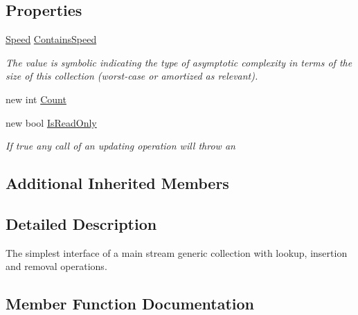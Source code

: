 \subsection*{Properties}
\begin{DoxyCompactItemize}
\item 
\hyperlink{namespace_c5_a615ba88dcdaa8d5a3c5f833a73d7fad6}{Speed} \hyperlink{interface_c5_1_1_i_collection_a0a9bcd98894c191206e18c7c20c3bdfe}{Contains\+Speed}
\begin{DoxyCompactList}\small\item\em The value is symbolic indicating the type of asymptotic complexity in terms of the size of this collection (worst-\/case or amortized as relevant). \end{DoxyCompactList}\item 
new int \hyperlink{interface_c5_1_1_i_collection_abddff5406ccd4e98d8d96f41bf9d6d5b}{Count}
\item 
new bool \hyperlink{interface_c5_1_1_i_collection_a94b0751f2b2fbd0519233b2755c055b4}{Is\+Read\+Only}
\begin{DoxyCompactList}\small\item\em If true any call of an updating operation will throw an \end{DoxyCompactList}\end{DoxyCompactItemize}
\subsection*{Additional Inherited Members}


\subsection{Detailed Description}
The simplest interface of a main stream generic collection with lookup, insertion and removal operations. 



\subsection{Member Function Documentation}
\hypertarget{interface_c5_1_1_i_collection_a525115f252ddca586fcbf1a0127be614}{}

